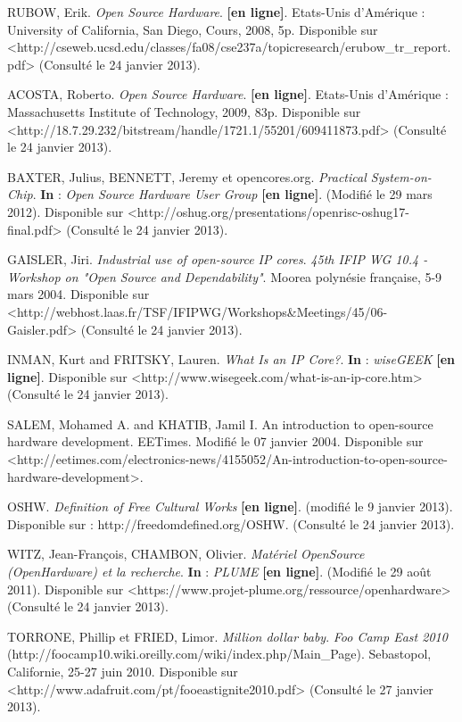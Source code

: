 ﻿
RUBOW, Erik. \textit{Open Source Hardware}. \textbf{[en ligne]}. Etats-Unis d'Amérique : University of California, San Diego, Cours, 2008, 5p. Disponible sur <http://cseweb.ucsd.edu/classes/fa08/cse237a/topicresearch/erubow\_tr\_report.pdf> (Consulté le 24 janvier 2013).

ACOSTA, Roberto. \textit{Open Source Hardware}. \textbf{[en ligne]}. Etats-Unis d'Amérique : Massachusetts Institute of Technology, 2009, 83p. Disponible sur <http://18.7.29.232/bitstream/handle/1721.1/55201/609411873.pdf> (Consulté le 24 janvier 2013).

BAXTER, Julius, BENNETT, Jeremy et opencores.org. \textit{Practical System-on-Chip}. \textbf{In} : \textit{Open Source Hardware User Group} \textbf{[en ligne]}. (Modifié le 29 mars 2012). Disponible sur <http://oshug.org/presentations/openrisc-oshug17-final.pdf> (Consulté le 24 janvier 2013).

GAISLER, Jiri. \textit{Industrial use of open-source IP cores}. \textit{45th IFIP WG 10.4 - Workshop on "Open Source and Dependability"}. Moorea polynésie française, 5-9 mars 2004. Disponible sur <http://webhost.laas.fr/TSF/IFIPWG/Workshops\&Meetings/45/06-Gaisler.pdf> (Consulté le 24 janvier 2013).

INMAN, Kurt and FRITSKY, Lauren. \textit{What Is an IP Core?}. \textbf{In} : \textit{wiseGEEK} \textbf{[en ligne]}. Disponible sur <http://www.wisegeek.com/what-is-an-ip-core.htm> (Consulté le 24 janvier 2013).

SALEM, Mohamed A. and KHATIB, Jamil I. An introduction to open-source hardware development. EETimes. Modifié le 07 janvier 2004. Disponible sur <http://eetimes.com/electronics-news/4155052/An-introduction-to-open-source-hardware-development>.

OSHW. \textit{Definition of Free Cultural Works} \textbf{[en ligne]}. (modifié le 9 janvier 2013). Disponible sur : http://freedomdefined.org/OSHW. (Consulté le 24 janvier 2013).

WITZ, Jean-François, CHAMBON, Olivier. \textit{Matériel OpenSource (OpenHardware) et la recherche}. \textbf{In} : \textit{PLUME} \textbf{[en ligne]}. (Modifié le 29 août 2011). Disponible sur <https://www.projet-plume.org/ressource/openhardware> (Consulté le 24 janvier 2013).

TORRONE, Phillip et FRIED, Limor. \textit{Million dollar baby}. \textit{Foo Camp East 2010} (http://foocamp10.wiki.oreilly.com/wiki/index.php/Main\_Page). Sebastopol, Californie, 25-27 juin 2010. Disponible sur <http://www.adafruit.com/pt/fooeastignite2010.pdf> (Consulté le 27 janvier 2013).

